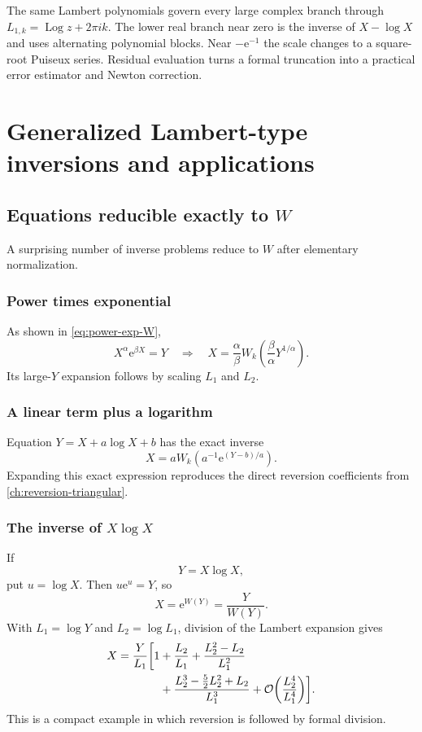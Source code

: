 \documentclass[11pt,oneside]{book}
\theoremstyle{definition}
\theoremstyle{remark}
\DeclareMathOperator{\Log}{Log}
\newcommand{\e}{\mathrm e}
\newcommand{\bigO}{\mathcal O}
\begin{document}
\begin{summarybox}
The same Lambert polynomials govern every large complex branch through
$L_{1,k}=\Log z+2\pi i k$.  The lower real branch near zero is the inverse of
$X-\log X$ and uses alternating polynomial blocks.  Near $-\e^{-1}$ the scale
changes to a square-root Puiseux series.  Residual evaluation turns a formal
truncation into a practical error estimator and Newton correction.
\end{summarybox}


\chapter{Generalized Lambert-type inversions and applications}
\label{ch:lambert-applications}

\section{Equations reducible exactly to \texorpdfstring{$W$}{W}}
A surprising number of inverse problems reduce to $W$ after elementary
normalization.

\subsection{Power times exponential}
As shown in \eqref{eq:power-exp-W},
\[
 X^\alpha\e^{\beta X}=Y
 \quad\Longrightarrow\quad
 X=\frac{\alpha}{\beta}
 W_k\!\left(\frac{\beta}{\alpha}Y^{1/\alpha}\right).
\]
Its large-$Y$ expansion follows by scaling $L_1$ and $L_2$.

\subsection{A linear term plus a logarithm}
Equation $Y=X+a\log X+b$ has the exact inverse
\[
 X=aW_k\!\left(a^{-1}\e^{(Y-b)/a}\right).
\]
Expanding this exact expression reproduces the direct reversion coefficients
from \cref{ch:reversion-triangular}.

\subsection{The inverse of \texorpdfstring{$X\log X$}{X log X}}
If
\[
 Y=X\log X,
\]
put $u=\log X$.  Then $u\e^u=Y$, so
\begin{equation}\label{eq:XlogX-inverse}
 X=\e^{W(Y)}=\frac{Y}{W(Y)}.
\end{equation}
With $L_1=\log Y$ and $L_2=\log L_1$, division of the Lambert expansion gives
\begin{align}\label{eq:XlogX-asymptotic}
 X=\frac{Y}{L_1}\biggl[1
 &+\frac{L_2}{L_1}
 +\frac{L_2^2-L_2}{L_1^2}\\
 &+\frac{L_2^3-\frac52L_2^2+L_2}{L_1^3}
 +\bigO\!\left(\frac{L_2^4}{L_1^4}\right)\biggr].\notag
\end{align}
This is a compact example in which reversion is followed by formal division.
\end{document}
